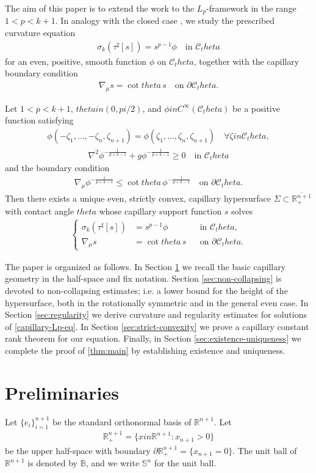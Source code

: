 \documentclass[12pt]{amsart}
\def\theta{theta}%
\def\pi{pi}%
\def\in{in }%
\numberwithin{equation}{section}
\newcommand{\bbR}{\mathbb{R}}
\newcommand{\bbS}{\mathbb{S}}
\newcommand{\bbB}{\mathbb{B}}
\newcommand{\8}{\infty}
\newcommand{\si}{\sigma}
\newcommand{\cC}{\mathcal{C}}
\newcommand{\n}{\nabla}
\newcommand{\eq}[1]{\begin{equation}\begin{alignedat}{2}#1\end{alignedat}\end{equation}}
\newcommand{\Cth}{\cC_\theta}
\begin{document}
The aim of this paper is to extend the work \cite{HIS25} to the $L_p$-framework in the range $1<p<k+1$. In analogy with the closed case \cite{GM03,GX18}, we study the prescribed curvature equation
\eq{
  \si_k(\tau^\sharp[s]) = s^{p-1}\phi
  \quad\text{in }\Cth
}
for an even, positive, smooth function $\phi$ on $\Cth$, together with the capillary boundary condition
\eq{
  \n_\mu s = \cot\theta\,s
  \quad\text{on }\partial\Cth.
}

\begin{thm}\label{thm:main}
Let $1 < p < k+1$, $\theta \in (0, \pi/2)$, and $\phi \in C^\infty(\mathcal{C}_\theta)$ be a positive function satisfying
\eq{
\phi(-\zeta_1,\ldots,-\zeta_n,\zeta_{n+1})=\phi(\zeta_1,\ldots,\zeta_n,\zeta_{n+1})\quad \forall \zeta\in \Cth,
}
\eq{\label{spherically-convex}
\nabla^2\phi^{-\frac{1}{p+k-1}} + g\phi^{-\frac{1}{p+k-1}} \ge 0 \quad \text{in }\Cth
}
and the boundary condition
\eq{ \label{bdry-condition}
\nabla_\mu\phi^{-\frac{1}{p+k-1}} \le \cot\theta \,\phi^{-\frac{1}{p+k-1}} \quad \text{on } \partial\mathcal{C}_\theta.
}
Then there exists a unique even, strictly convex, capillary hypersurface $\Sigma \subset \overline{\mathbb{R}^{n+1}_+}$ with contact angle $\theta$ whose capillary support function $s$ solves
\eq{\label{capillary-Lp-eq}
\left\{
\begin{aligned}
  \sigma_k(\tau^\sharp[s])
    &= s^{p-1} \phi
    &&\text{in }\Cth,\\
  \nabla_\mu s &= \cot\theta\,s
    &&\text{on }\partial\Cth.
\end{aligned}
\right.
}
\end{thm}

The paper is organized as follows. In Section \ref{sec:preliminaries} we recall the basic capillary geometry in the half-space and fix notation. Section \ref{sec:non-collapsing} is devoted to non-collapsing estimates; i.e. a lower bound for the height of the hypersurface, both in the rotationally symmetric and in the general even case. In Section \ref{sec:regularity} we derive curvature and regularity estimates for solutions of \eqref{capillary-Lp-eq}. In Section \ref{sec:strict-convexity} we prove a capillary constant rank theorem for our equation. Finally, in Section \ref{sec:existence-uniqueness} we complete the proof of \autoref{thm:main} by establishing existence and uniqueness.

\section{Preliminaries}\label{sec:preliminaries}
Let $\{e_i\}_{i=1}^{n+1}$ be the standard orthonormal basis of $\bbR^{n+1}$. Let 
\eq{
\mathbb{R}^{n+1}_+ = \{x \in \mathbb{R}^{n+1}: x_{n+1} > 0\}
}
be the upper half-space with boundary $\partial\mathbb{R}^{n+1}_+ = \{x_{n+1} = 0\}$. The unit ball of $\bbR^{n+1}$ is denoted by $\bbB$, and we write $\bbS^n$ for the unit ball.
\end{document}
